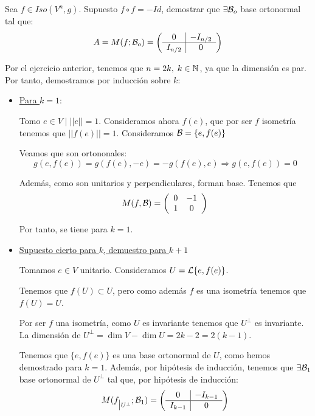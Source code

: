\begin{ejercicio}
    Sea $f\in Iso(V^n, g)$. Supuesto $f\circ f=-Id$, demostrar que $\exists \mathcal{B}_o$ base ortonormal tal que:
    \begin{equation*}
        A = M(f;\mathcal{B}_o)
        = \left(\begin{array}{c|c}
            0 & -I_{n/2} \\ \hline
            I_{n/2} & 0
        \end{array}\right)
    \end{equation*}


    Por el ejercicio anterior, tenemos que $n=2k,\;k\in \mathbb{N}$, ya que la dimensión es par. Por tanto, demostramos por inducción sobre $k$:
    \begin{itemize}
        \item \underline{Para $k=1$}:

        Tomo $e\in V \mid ||e||=1$. Consideramos ahora $f(e)$, que por ser $f$ isometría tenemos que $||f(e)||=1$. Consideramos $\mathcal{B}=\{e, f(e)\}$

        Veamos que son ortononales:
        \begin{equation*}
            g(e, f(e)) = g(f(e), -e) = -g(f(e), e) \Longrightarrow g(e, f(e))=0
        \end{equation*}

        Además, como son unitarios y perpendiculares, forman base. Tenemos que
        \begin{equation*}
            M(f,\mathcal{B}) = \left(\begin{array}{cc}
                0 & -1 \\
                1 & 0
            \end{array}\right)
        \end{equation*}

        Por tanto, se tiene para $k=1$.

        \item \underline{Supuesto cierto para $k$, demuestro para $k+1$}

        Tomamos $e\in V$ unitario. Consideramos $U=\mathcal{L}\{e, f(e)\}$.

        Tenemos que $f(U)\subset U$, pero como además $f$ es una isometría tenemos que $f(U)=U$.

        Por ser $f$ una isometría, como $U$ es invariante tenemos que $U^\perp$ es invariante. La dimensión de $U^\perp = \dim V - \dim U = 2k-2 = 2(k-1)$.

        Tenemos que $\{e, f(e)\}$ es una base ortonormal de $U$, como hemos demostrado para $k=1$. Además, por hipótesis de inducción, tenemos que $\exists \mathcal{B}_1$ base ortonormal de $U^\perp$
        tal que, por hipótesis de inducción:
        \begin{equation*}
            M(f_{\big | U^\perp};\mathcal{B}_1)
            = \left(\begin{array}{c|c}
                0 & -I_{k-1} \\ \hline
                I_{k-1} & 0
            \end{array}\right)
        \end{equation*}


\end{itemize}
\end{ejercicio}
